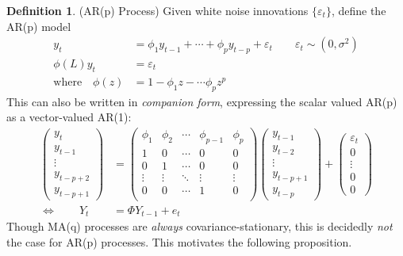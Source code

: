 \documentclass[12pt]{article}
\theoremstyle{plain}
\theoremstyle{definition}
\newtheorem{defn}[thm]{Definition}
\theoremstyle{remark}
\begin{document}
\begin{defn}(AR(p) Process)
Given white noise innovations $\{\varepsilon_t\}$, define the AR(p)
model
\begin{align*}
  y_t
  &= \phi_1 y_{t-1} + \cdots + \phi_p y_{t-p} + \varepsilon_t
  \qquad \varepsilon_t\sim(0,\sigma^2) \\
  \phi(L)y_t &= \varepsilon_t \\
  \text{where}\quad
  \phi(z)
  &= 1-\phi_1z - \cdots \phi_pz^p
\end{align*}
This can also be written in \emph{companion form}, expressing the scalar
valued AR(p) as a vector-valued AR(1):
\begin{align*}
  \begin{pmatrix}
    y_t \\ y_{t-1}\\\vdots \\ y_{t-p+2}\\y_{t-p+1}
  \end{pmatrix}
  &=
  \begin{pmatrix}
    \phi_1 & \phi_2 & \cdots& \phi_{p-1} & \phi_p \\
    1 & 0 & \cdots & 0 & 0\\
    0 & 1 & \cdots & 0 & 0\\
    \vdots & \vdots & \ddots & \vdots & \vdots \\
    0 & 0 & \cdots & 1 & 0\\
  \end{pmatrix}
  \begin{pmatrix}
    y_{t-1} \\ y_{t-2}\\\vdots \\ y_{t-p+1} \\y_{t-p}
  \end{pmatrix}
  +
  \begin{pmatrix}
     \varepsilon_t\\ 0\\\vdots \\ 0 \\0
  \end{pmatrix}
   \\
  \iff \qquad
  Y_t &= \Phi Y_{t-1} + e_t
\end{align*}
Though MA(q) processes are \emph{always} covariance-stationary, this is
decidedly \emph{not} the case for AR(p) processes. This motivates the
following proposition.
\end{defn}
\end{document}
